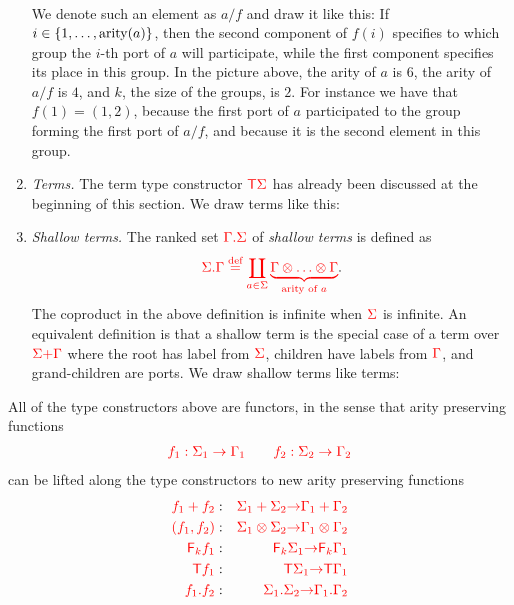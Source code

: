 \begin{definition}[Types]
\begin{enumerate}
\begin{align*}
            \end{align*}
            We denote such an element as $a/f$ and draw it like this: 
            If $i\in  \{1,\ldots,\mathrm{arity}(a)\}$, then the second component of $f(i)$ specifies to which group the $i$-th port of $a$ will participate, while the first component specifies its place in this group. In the picture above, the arity of $a$ is $6$, the arity of $a/f$ is $4$, and $k$, the size of the groups,  is $2$. For instance we have that $f(1)=(1,2)$, because the first port of $a$ participated to the group forming the first port of $a/f$, and because it is the second element in this group.
        \item \emph{Terms.} The term type constructor ${\color{red}{\mathsf T}} {\color{red}{\Sigma}}$ has already been discussed at the beginning of this section.  We draw terms like this:
        \item \emph{Shallow terms.} The  ranked set ${\color{red}{{\color{red}{\Gamma}}. {\color{red}{\Sigma}}}}$ of  \emph{shallow terms} is defined as
        \begin{align*}
            {\color{red}{{\color{red}{{\color{red}{\Sigma}}. {\color{red}{\Gamma}}}} \stackrel{\text{def}}=\coprod_{a \in {\color{red}{\Sigma}}} \underbrace{{\color{red}{\Gamma}}\otimes\ldots\otimes{\color{red}{\Gamma}}}_{\text{arity of $a$}}}}.
        \end{align*}
        The coproduct in the above definition is infinite when ${\color{red}{\Sigma}}$ is infinite. 
        An equivalent definition is that a shallow term  is the special case of  a term over ${\color{red}{\Sigma}} {\color{red}{+}} {\color{red}{\Gamma}}$ where  the root has label from ${\color{red}{\Sigma}}$,  children have labels  from ${\color{red}{\Gamma}}$, and grand-children are ports. We draw shallow terms like terms:
    \end{enumerate}
\end{definition}


\newcommand{\funcitem}[3]{\ranked{#1  } &:& \ranked{#2} \rto  \ranked{#3}}
All of the type constructors  above are functors, in the sense  that  arity preserving functions
\begin{align*}
{\color{red}{f_1 : \Sigma_1 \to \Gamma_1 \qquad f_2 : \Sigma_2 \to \Gamma_2}}
\end{align*}       
can be lifted along the type constructors to new arity preserving  functions
\begin{eqnarray}
\label{eq:liftplus}\funcitem{f_1 + f_2}{\Sigma_1 + \Sigma_2}{\Gamma_1 + \Gamma_2} \\
\funcitem{(f_1,f_2)}{\Sigma_1 \otimes \Sigma_2}{\Gamma_1 \otimes \Gamma_2}\\
\funcitem{\reduce k f_1}{\reduce k \Sigma_1}{\reduce k \Gamma_1}\\
\funcitem{\tmonad f_1}{\tmonad \Sigma_1}{\tmonad \Gamma_1}\\
\label{eq:liftshallow}\funcitem{\shallowterm{f_1}{f_2}}{\shallowterm{\Sigma_1}{\Sigma_2}}{\shallowterm {\Gamma_1}{\Gamma_2}} 
\end{eqnarray}

